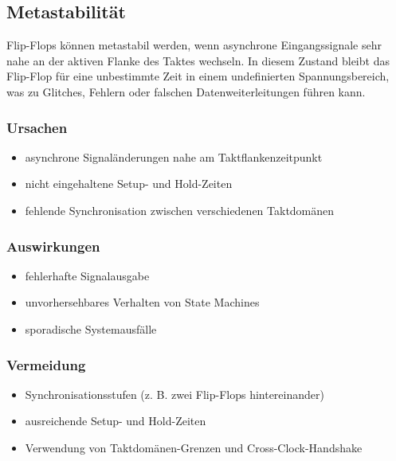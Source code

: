 \newpage
\subsection{Metastabilität}
Flip-Flops können metastabil werden, wenn asynchrone Eingangssignale sehr nahe an der aktiven Flanke des Taktes wechseln. In diesem Zustand bleibt das Flip-Flop für eine unbestimmte Zeit in einem undefinierten Spannungsbereich, was zu Glitches, Fehlern oder falschen Datenweiterleitungen führen kann.

\subsubsection{Ursachen}
\begin{itemize}
  \item asynchrone Signaländerungen nahe am Taktflankenzeitpunkt
  \item nicht eingehaltene Setup- und Hold-Zeiten
  \item fehlende Synchronisation zwischen verschiedenen Taktdomänen
\end{itemize}

\subsubsection{Auswirkungen}
\begin{itemize}
  \item fehlerhafte Signalausgabe
  \item unvorhersehbares Verhalten von State Machines
  \item sporadische Systemausfälle
\end{itemize}

\subsubsection{Vermeidung}
\begin{itemize}
  \item Synchronisationsstufen (z. B. zwei Flip-Flops hintereinander)
  \item ausreichende Setup- und Hold-Zeiten
  \item Verwendung von Taktdomänen-Grenzen und Cross-Clock-Handshake
\end{itemize}
